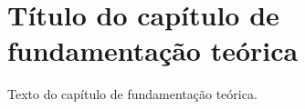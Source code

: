 \chapter{Título do capítulo de fundamentação teórica}\label{cap:fundamentacao_teorica}

Texto do capítulo de fundamentação teórica.